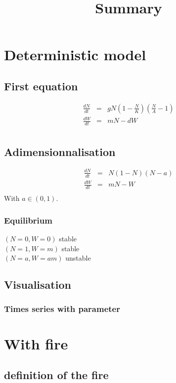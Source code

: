 \documentclass{article}
\title{Summary}
\begin{document}
\maketitle




\section{Deterministic model}

\subsection{First equation}
\[
\begin{array}{rcl}
\frac{dN}{dt} & = & gN(1-\frac{N}{K})(\frac{N}{A}-1) \\
\frac{dW}{dt} & = & mN-dW \\
\end{array}
\]

\subsection{Adimensionnalisation}
\[
\begin{array}{rcl}
\frac{dN}{dt} & = & N(1-N)(N-a) \\
\frac{dW}{dt} & = & mN-W \\
\end{array}
\]
With $a\in(0,1)$.

\subsubsection{Equilibrium}
$(N = 0, W = 0) $ stable \\
$(N = 1, W = m) $ stable \\
$(N = a, W = am) $ unstable \\

\subsection{Visualisation}

\subsubsection{Times series with parameter}

\newpage
\section{With fire}

\subsection{definition of the fire}





%
%
\end{document}
